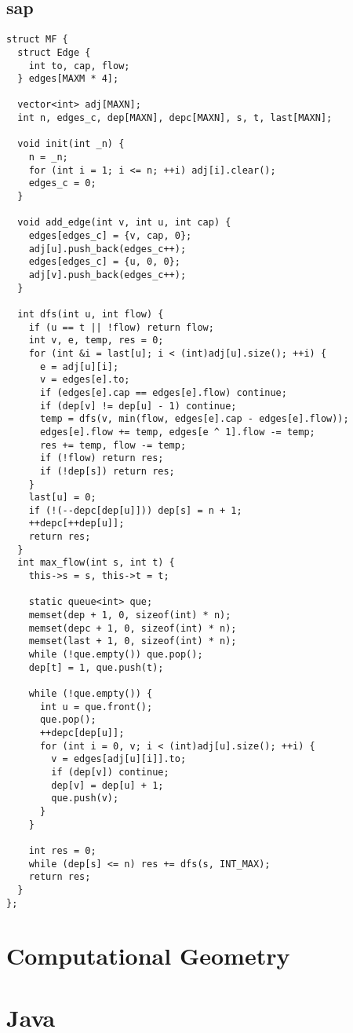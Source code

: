 \documentclass[twoside]{article}
\begin{document}
\subsection{sap}
\begin{lstlisting}
struct MF {
  struct Edge {
    int to, cap, flow;
  } edges[MAXM * 4];

  vector<int> adj[MAXN];
  int n, edges_c, dep[MAXN], depc[MAXN], s, t, last[MAXN];

  void init(int _n) {
    n = _n;
    for (int i = 1; i <= n; ++i) adj[i].clear();
    edges_c = 0;
  }

  void add_edge(int v, int u, int cap) {
    edges[edges_c] = {v, cap, 0};
    adj[u].push_back(edges_c++);
    edges[edges_c] = {u, 0, 0};
    adj[v].push_back(edges_c++);
  }

  int dfs(int u, int flow) {
    if (u == t || !flow) return flow;
    int v, e, temp, res = 0;
    for (int &i = last[u]; i < (int)adj[u].size(); ++i) {
      e = adj[u][i];
      v = edges[e].to;
      if (edges[e].cap == edges[e].flow) continue;
      if (dep[v] != dep[u] - 1) continue;
      temp = dfs(v, min(flow, edges[e].cap - edges[e].flow));
      edges[e].flow += temp, edges[e ^ 1].flow -= temp;
      res += temp, flow -= temp;
      if (!flow) return res;
      if (!dep[s]) return res;
    }
    last[u] = 0;
    if (!(--depc[dep[u]])) dep[s] = n + 1;
    ++depc[++dep[u]];
    return res;
  }
  int max_flow(int s, int t) {
    this->s = s, this->t = t;

    static queue<int> que;
    memset(dep + 1, 0, sizeof(int) * n);
    memset(depc + 1, 0, sizeof(int) * n);
    memset(last + 1, 0, sizeof(int) * n);
    while (!que.empty()) que.pop();
    dep[t] = 1, que.push(t);

    while (!que.empty()) {
      int u = que.front();
      que.pop();
      ++depc[dep[u]];
      for (int i = 0, v; i < (int)adj[u].size(); ++i) {
        v = edges[adj[u][i]].to;
        if (dep[v]) continue;
        dep[v] = dep[u] + 1;
        que.push(v);
      }
    }

    int res = 0;
    while (dep[s] <= n) res += dfs(s, INT_MAX);
    return res;
  }
};

\end{lstlisting}

\section{Computational Geometry}


\section{Java}
\end{document}
